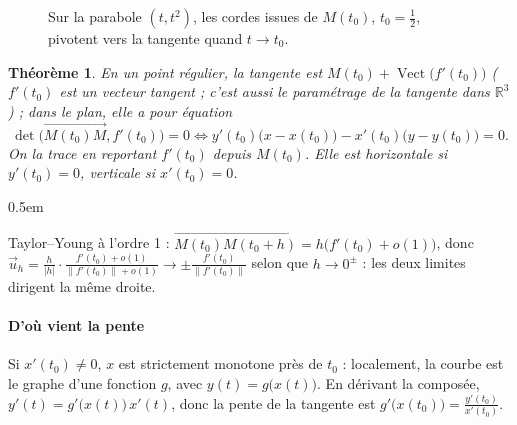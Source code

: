 \documentclass[a4paper,11pt]{article}
\makeatletter
\numberwithin{equation}{section}
\numberwithin{figure}{section}
\numberwithin{table}{section}
\theoremstyle{enonce}
\newtheorem{theoreme}[definition]{Théorème}
\theoremstyle{exemple}
\theoremstyle{remarque}
\renewcommand{\proofname}{Démonstration}
\renewenvironment{proof}[1][\proofname]{\par\pushQED{\qed}\normalfont
  \topsep0.5em\relax\trivlist\item[\hskip\labelsep\sffamily\itshape\color{Gris}#1.]\ignorespaces}
  {\popQED\endtrivlist\@endpefalse}
\newcommand{\R}{\mathbb{R}}
\newcommand{\vect}{\operatorname{Vect}}
\newcommand{\vv}[1]{\overrightarrow{#1}}
\newcommand{\ve}[1]{\vec{#1}}
\makeatother
\begin{document}
\begin{figure}[H]
\centering
{}
\caption{Sur la parabole $(t,t^2)$, les cordes issues de $M(t_0)$, $t_0=\frac12$, pivotent vers la tangente quand $t\to t_0$.}\label{fig:cordes}
\end{figure}

\begin{theoreme}\label{thm:tgte}
En un point régulier, la tangente est $M(t_0)+\vect\big(f'(t_0)\big)$ ($f'(t_0)$ est un \emph{vecteur tangent} ; c'est
aussi le paramétrage de la tangente dans $\R^3$) ; dans le plan, elle a pour équation
\[\det\big(\vv{M(t_0)M},f'(t_0)\big)=0\iff y'(t_0)\big(x-x(t_0)\big)-x'(t_0)\big(y-y(t_0)\big)=0.\]
On la trace en reportant $f'(t_0)$ depuis $M(t_0)$. Elle est horizontale si $y'(t_0)=0$, verticale si $x'(t_0)=0$.
\end{theoreme}

\begin{proof}
Taylor--Young à l'ordre 1 : $\vv{M(t_0)M(t_0+h)}=h\big(f'(t_0)+o(1)\big)$, donc
$\ve u_h=\frac{h}{|h|}\cdot\frac{f'(t_0)+o(1)}{\|f'(t_0)\|+o(1)}\to\pm\frac{f'(t_0)}{\|f'(t_0)\|}$ selon que $h\to0^\pm$ : les deux
limites dirigent la même droite.
\end{proof}

\paragraph{D'où vient la pente} Si $x'(t_0)\neq0$, $x$ est strictement monotone près de $t_0$ : localement, la courbe est le
graphe d'une fonction $g$, avec $y(t)=g\big(x(t)\big)$. En dérivant la composée, $y'(t)=g'\big(x(t)\big)\,x'(t)$, donc la pente
de la tangente est $g'\big(x(t_0)\big)=\frac{y'(t_0)}{x'(t_0)}$.
\end{document}

